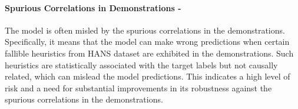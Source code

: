 \paragraph{Spurious Correlations in Demonstrations - \high}
The model is often misled by the spurious correlations in the demonstrations. Specifically, it means that the model can make wrong predictions when certain fallible heuristics from HANS dataset are exhibited in the demonstrations. Such heuristics are statistically associated with the target labels but not causally related, which can mislead the model predictions. This indicates a high level of risk and a need for substantial improvements in its robustness against the spurious correlations in the demonstrations.